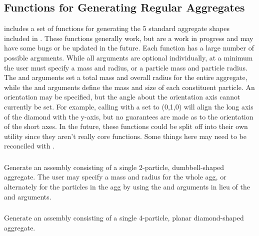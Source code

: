 \subsection{Functions for Generating Regular Aggregates}

 includes a set of functions for generating the 5 standard \pkd{} aggregate shapes included in . These functions generally work, but are a work in progress and may have some bugs or be updated in the future. Each function has a large number of possible arguments. While all arguments are optional individually, at a minimum the user must specify a mass and radius, or a particle mass and particle radius. The  and  arguments set a total mass and overall radius for the entire aggregate, while the  and  arguments define the mass and size of each constituent particle. An orientation may be specified, but the angle about the orientation axis cannot currently be set. For example, calling  with a  set to (0,1,0) will align the long axis of the diamond with the y-axis, but no guarantees are made as to the orientation of the short axes. In the future, these functions could be split off into their own utility since they aren't really core functions. Some things here may need to be reconciled with .


\subsubsection{}
Generate an assembly consisting of a single 2-particle, dumbbell-shaped aggregate. The user may specify a mass and radius for the whole agg, or alternately for the particles in the agg by using the  and  arguments in lieu of the  and  arguments. 

\subsubsection{}
Generate an assembly consisting of a single 4-particle, planar diamond-shaped aggregate.

